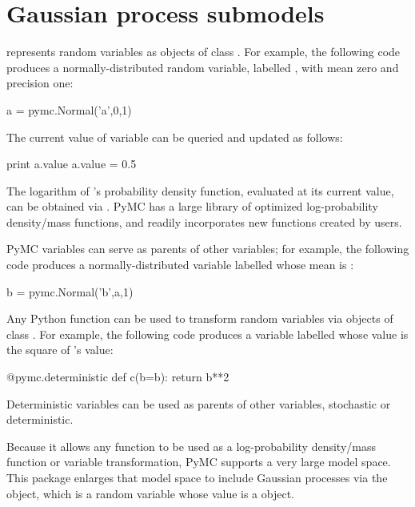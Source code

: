 \section{Gaussian process submodels}
\label{sec:gp-sub}

 \citep{pymc} represents random variables as objects of class . For example, the following code produces a normally-distributed random variable, labelled , with mean zero and precision one:
\begin{CodeChunk}
\begin{CodeInput}
a = pymc.Normal('a',0,1)
\end{CodeInput}
\end{CodeChunk}
The current value of variable  can be queried and updated as follows:
\begin{CodeChunk}
\begin{CodeInput}
print a.value
a.value = 0.5
\end{CodeInput}
\end{CodeChunk}
The logarithm of 's probability density function, evaluated at its current value, can be obtained via . PyMC has a large library of optimized log-probability density/mass functions, and readily incorporates new functions created by users.

PyMC variables can serve as parents of other variables; for example, the following code produces a normally-distributed variable labelled  whose mean is :
\begin{CodeChunk}
\begin{CodeInput}
b = pymc.Normal('b',a,1)
\end{CodeInput}
\end{CodeChunk}

Any Python function can be used to transform random variables via objects of class . For example, the following code produces a variable labelled  whose value is the square of  's value:
\begin{CodeChunk}
\begin{CodeInput}
@pymc.deterministic
def c(b=b):
    return b**2
\end{CodeInput}
\end{CodeChunk}
Deterministic variables can be used as parents of other variables, stochastic or deterministic.

Because it allows any  function to be used as a log-probability density/mass function or variable transformation, PyMC supports a very large model space. This package enlarges that model space to include Gaussian processes via the  object, which is a random variable whose value is a  object.


